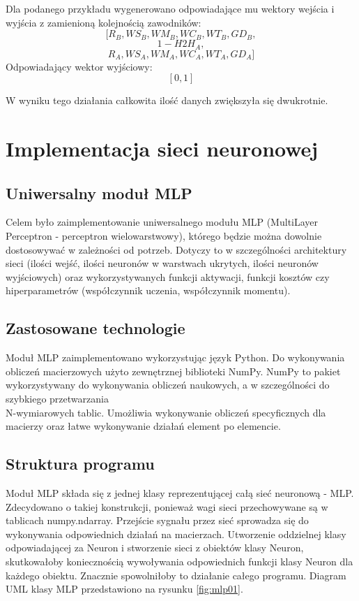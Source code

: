 Dla podanego przykładu wygenerowano odpowiadające mu wektory wejścia i wyjścia z zamienioną kolejnością zawodników:
$$[R_B, WS_B, WM_B, WC_B, WT_B, GD_B,$$
$$1-H2H_A,$$  
$$R_A, WS_A, WM_A, WC_A, WT_A, GD_A]$$
Odpowiadający wektor wyjściowy: $$[0, 1]$$

W wyniku tego działania całkowita ilość danych zwiększyła się dwukrotnie.

\chapter{Implementacja sieci neuronowej}
\section{Uniwersalny moduł MLP}
\label{Sec:MLPMod}

Celem było zaimplementowanie uniwersalnego modułu MLP (MultiLayer Perceptron - perceptron wielowarstwowy), którego będzie można dowolnie dostosowywać w zależności od potrzeb. Dotyczy to w szczególności architektury sieci (ilości wejść, ilości neuronów w warstwach ukrytych, ilości neuronów wyjściowych) oraz wykorzystywanych funkcji aktywacji, funkcji kosztów czy hiperparametrów (współczynnik uczenia, współczynnik momentu).

\section{Zastosowane technologie}
\label{Sec:MLPTech}
Moduł MLP zaimplementowano wykorzystując język Python. Do wykonywania obliczeń macierzowych użyto zewnętrznej biblioteki NumPy. NumPy to pakiet wykorzystywany do wykonywania obliczeń naukowych, a w szczególności do szybkiego przetwarzania \\ N-wymiarowych tablic. Umożliwia wykonywanie obliczeń specyficznych dla macierzy oraz łatwe wykonywanie działań element po elemencie.


\section{Struktura programu}
\label{Sec:MLPStruct}
Moduł MLP składa się z jednej klasy reprezentującej całą sieć neuronową - MLP. Zdecydowano o takiej konstrukcji, ponieważ wagi sieci przechowywane są w tablicach numpy.ndarray. Przejście sygnału przez sieć sprowadza się do wykonywania odpowiednich działań na macierzach. Utworzenie oddzielnej klasy odpowiadającej za Neuron i stworzenie sieci z obiektów klasy Neuron, skutkowałoby koniecznością wywoływania odpowiednich funkcji klasy Neuron dla każdego obiektu. Znacznie spowolniłoby to działanie całego programu. Diagram UML klasy MLP przedstawiono na rysunku \ref{fig:mlp01}.

